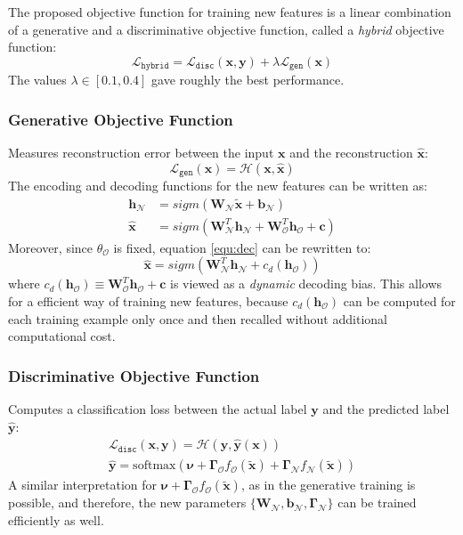\documentclass[a4paper,twocolumn]{article}
\renewcommand{\H}{\mathcal{H}}
\newcommand{\N}{\mathcal{N}}
\renewcommand{\L}{\mathcal{L}}
\renewcommand{\O}{\mathcal{O}}
\newcommand{\Lhybrid}{\L_{\mathtt{hybrid}}}
\newcommand{\Ldisc}{\L_{\mathtt{disc}}}
\newcommand{\Lgen}{\L_{\mathtt{gen}}}
\let\originalnu\nu
\renewcommand{\nu}{\boldsymbol{\originalnu}}
\begin{document}
The proposed objective function for training new features is a linear combination of a generative and a discriminative objective function, called a \textit{hybrid} objective function:
\begin{equation}
    \Lhybrid = \Ldisc(\mathbf{x}, \mathbf{y}) + \lambda\Lgen(\mathbf{x})
\end{equation}
The values $\lambda \in [0.1, 0.4]$ gave roughly the best performance.

\subsubsection{Generative Objective Function}
Measures reconstruction error between the input $\mathbf{x}$ and the reconstruction $\mathbf{\widehat{x}}$:
\begin{equation}
    \Lgen(\mathbf{x}) = \H(\mathbf{x}, \mathbf{\widehat{x}})
\end{equation}
The encoding and decoding functions for the new features can be written as:
\begin{align}
    \mathbf{h}_\N &= sigm(\mathbf{W_\N \widetilde{x}} + \mathbf{b_\N}) \\
 \label{equ:dec}
    \mathbf{\widehat{x}} &= sigm(\mathbf{W}_\N^T\mathbf{h}_\N + \mathbf{W}_\O^T\mathbf{h}_\O + \mathbf{c})
\end{align}
Moreover, since $\theta_\O$ is fixed, equation \eqref{equ:dec} can be rewritten to:
\begin{equation}
    \mathbf{\widehat{x}} = sigm(\mathbf{W}_\N^T\mathbf{h}_\N + c_d(\mathbf{h}_\O))
\end{equation}
where $c_d(\mathbf{h}_\O) \equiv \mathbf{W}_\O^T\mathbf{h}_\O + \mathbf{c}$ is viewed as a \textit{dynamic} decoding bias.
This allows for a efficient way of training new features, because $c_d(\mathbf{h}_\O)$ can be computed for each training example only once and then recalled without additional computational cost.

\subsubsection{Discriminative Objective Function}
Computes a classification loss between the actual label $\mathbf{y}$ and the predicted label $\mathbf{\widehat{y}}$:
\begin{gather}
    \Ldisc(\mathbf{x}, \mathbf{y}) = \H(\mathbf{y}, \mathbf{\widehat{y}}(\mathbf{x})) \\
    \mathbf{\widehat{y}} = \mathrm{softmax}(\nu + \mathbf{\Gamma_\O}f_\O(\mathbf{\widetilde{x}}) + \mathbf{\Gamma_\N}f_\N(\mathbf{\widetilde{x}}))
\end{gather}
A similar interpretation for $\nu + \mathbf{\Gamma_\O}f_\O(\mathbf{\widetilde{x}})$, as in the generative training is possible, and therefore, the new parameters $\{\mathbf{W_\N, b_\N, \Gamma_\N}\}$ can be trained efficiently as well.
\end{document}
